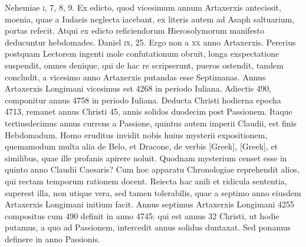 Nehemiae \textsc{i}, 7, 8, 9.
Ex edicto, quod vicesimum
annum Artaxerxis antecissit, moenia, quae a Iudaeis neglecta
iacebant, ex literis autem ad Asaph saltuarium, portas refecit.
Atqui ex edicto reficiendorum Hierosolymorum manifesto deducuntur
hebdomades.
Daniel \textsc{ix}, 25.
Ergo non a \textsc{xx} anno Artaxerxis.
Pererius postquam Lectorem ingenti mole confutationum
obruit, longa exspectatione suspendit, omnes denique, qui
de hac re scripserunt, pueros ostendit, tandem concludit, a vicesimo
anno Artaxerxis putandas esse Septimanas.
Annus Artaxerxis
Longimani vicesimus est 4268 in periodo Iuliana.
Adiectis 490,
componitur annus 4758 in periodo Iuliana.
Deducta Christi hodierna
epocha 4713, remanet annus Christi 45, annis solidos duodecim
post Passionem.
Itaque tertiusdecimus annus currens a Passione,
quintus autem imperii Claudii, est finis Hebdomadum.
Homo eruditus invidit nobis huius mysterii expositionem, quemamodum
multa alia de Belo, et Dracone, de verbis \textgreek{[Greek]},
\textgreek{[Greek]}, et similibus, quae ille profanis apirere noluit.
Quodnam mysterium censet esse in quinto anno Claudii Caesaris?
Cum hoc apparatu Chronologiae reprehendit alios, qui rectam
temporum rationem docent.
Reiecta hac anili et ridicula sententia,
superest illa, non utique vera, sed tamen tolerabilis, quae a
septimo anno eiusdem Artaxerxis Longimani initium facit.
Annus septimus Artaxerxis Longimani 4255 compositus cum 490
definit in anno 4745: qui est annus 32 Christi, ut hodie putamus,
a quo ad Passionem, intercedit annus solidus duntaxat.
Sed
ponamus definere in anno Passionis.
